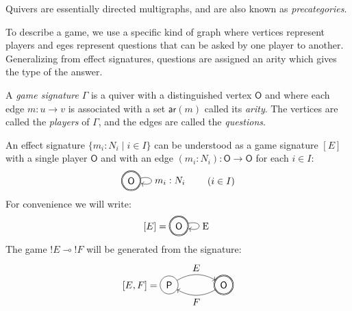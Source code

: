 \documentclass[format=sigplan,authordraft]{acmart}
\newcommand{\kw}[1]{\ensuremath{ \mathsf{#1} }}
\begin{document}
Quivers are essentially directed multigraphs,
and are also known as \emph{precategories}.

To describe a game,
we use a specific kind of graph
where vertices represent players
and eges represent questions that can be asked
by one player to another.
Generalizing from effect signatures,
questions are assigned an arity
which gives the type of the answer.

\begin{definition}
A \emph{game signature} $\Gamma$
is a quiver with a distinguished vertex $\kw{O}$
and where each edge $m : u \rightarrow v$
is associated with a set $\kw{ar}(m)$ called its \emph{arity}.
The vertices are called the \emph{players} of $\Gamma$,
and the edges are called the \emph{questions}.
\end{definition}

An effect signature $\{ m_i : N_i \mid i \in I \}$
can be understood as a game signature $[E]$
with a single player $\kw{O}$ and
with an edge $(m_i : N_i) : \kw{O} \rightarrow \kw{O}$
for each $i \in I$:
\[
  \begin{tikzpicture}[baseline=(O.base)]
    \node[circle,double,draw] (O) at (0,0) {$\kw{O}$};
    \path[->] (O) edge[loop right] node[auto] {$m_i : N_i$} (O);
  \end{tikzpicture}
  \qquad
  (i \in I)
\]
For convenience we will write:
\[
  [E] =
  \begin{tikzpicture}[baseline=(O.base)]
    \node[circle,double,draw] (O) at (0,0) {$\kw{O}$};
    \path[->] (O) edge[loop right] node[auto] {E} (O);
  \end{tikzpicture}
\]
The game ${!E} \multimap {!F}$ will be generated from
the signature:
\[
  [E,F] =
  \begin{tikzpicture}[baseline=(O.base),scale=2]
    \node[circle,draw,double] (O) at (0,0) {$\kw{O}$};
    \node[circle,draw] (P) at (-1,0) {$\kw{P}$};
    \path[->] (P) edge[bend left] node[above] {$E$} (O);
    \path[->] (O) edge[bend left] node[below] {$F$} (P);
  \end{tikzpicture}
\]
\end{document}
